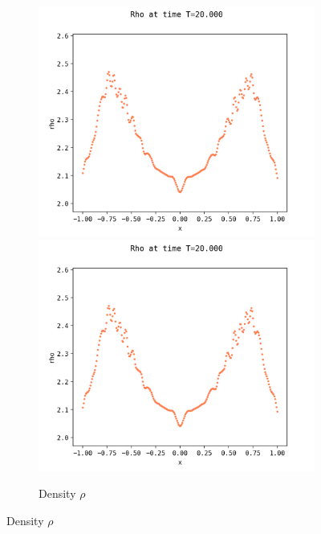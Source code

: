 \documentclass{article}
\numberwithin{equation}{section}
\newcommand{\mysubcaption}[1]{
	\vspace*{5pt}
	\begin{minipage}{0.8\linewidth}
		\begin{center}
			\footnotesize\emph{#1}
		\end{center}
	\end{minipage}
}
\newcommand{\imh}{\textheight} %
\newcommand{\imw}{\textwidth} %
\begin{document}
\begin{figure}
\begin{subfigure}{\textwidth}
		\includegraphics[height=\imh,width=\imw]{images/rhoT20_run5af_2.png}
		\includegraphics[height=\imh,width=\imw]{images/rhoT20_run5af_3.png}
		\caption{Density $\rho$}
	\end{subfigure}
	

\end{figure}
\end{document}
